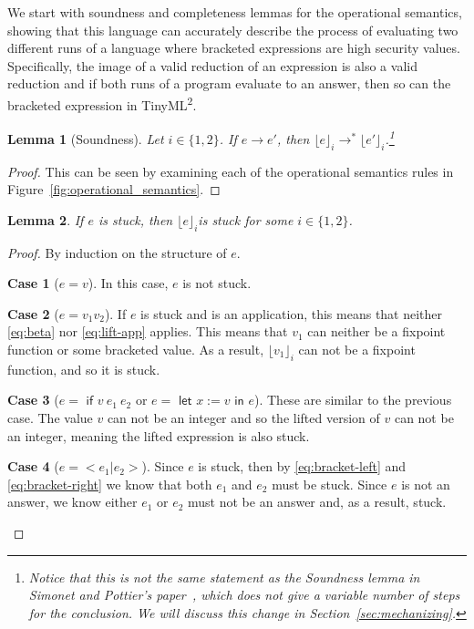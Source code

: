 \documentclass[a4paper,twocolumn]{article}
\newcommand{\langName}[0]{TinyML\textsuperscript{2}}
\newcommand{\lift}[1]{\lfloor #1 \rfloor}
\theoremstyle{plain}
\newtheorem{lemma}{Lemma}
\theoremstyle{definition}
\newtheorem*{case}{Case}
\begin{document}
We start with soundness and completeness lemmas for the operational semantics,
showing that this language can accurately describe the process of evaluating two
different runs of a language where bracketed expressions are high security
values.  Specifically, the image of a valid reduction of an expression is also a
valid reduction and if both runs of a program evaluate to an answer, then so can
the bracketed expression in \langName.

\begin{lemma}[Soundness]
  \label{lem:soundness}
  Let $i \in \{1, 2\}$. If $e \to e'$, then $\lift{e}_i \to^*
  \lift{e'}_i$.\footnote{Notice that this is not the same statement as the
  Soundness lemma in Simonet and Pottier's paper~\cite{InfoFlowML}, which does
  not give a variable number of steps for the conclusion.  We will discuss this
  change in Section~\ref{sec:mechanizing}.}
\end{lemma}
\begin{proof}
  This can be seen by examining each of the operational semantics rules in
  Figure~\ref{fig:operational_semantics}.
\end{proof}

\begin{lemma}
  \label{lem:stuck_bracket}
  If $e$ is stuck, then $\lift{e}_i$is stuck for some $i \in \{1, 2\}$.
\end{lemma}
\begin{proof}
  By induction on the structure of $e$.

  \begin{case}[$e = v$]
    In this case, $e$ is not stuck.
  \end{case}

  \begin{case}[$e = v_1 v_2$]
    If $e$ is stuck and is an application, this means that neither
    \ref{eq:beta} nor \ref{eq:lift-app} applies.  This means that $v_1$ can
    neither be a fixpoint function or some bracketed value.  As a result,
    $\lift{v_1}_i$ can not be a fixpoint function, and so it is stuck.
  \end{case}

  \begin{case}[$e = \textsf{ if } v \: e_1 \: e_2$ or $e =
    \textsf{ let } x := v \textsf{ in } e$]
    These are similar to the previous case.  The value $v$ can not be an integer
    and so the lifted version of $v$ can not be an integer, meaning the lifted
    expression is also stuck.
  \end{case}

  \begin{case}[$e = < e_1 | e_2 >$]
    Since $e$ is stuck, then by \ref{eq:bracket-left} and \ref{eq:bracket-right}
    we know that both $e_1$ and $e_2$ must be stuck.  Since $e$ is not an
    answer, we know either $e_1$ or $e_2$ must not be an answer and, as a
    result, stuck.
  \end{case}
\end{proof}
\end{document}
